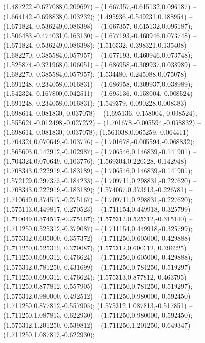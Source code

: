  (1.487222,-0.627088,0.209697) -- (1.667357,-0.615132,0.096187) -- (1.664142,-0.698838,0.103232);
 (1.495936,-0.549231,0.188954) -- (1.671824,-0.536249,0.086398) -- (1.667357,-0.615132,0.096187);
 (1.506483,-0.474031,0.163130) -- (1.677193,-0.460946,0.073748) -- (1.671824,-0.536249,0.086398);
 (1.516532,-0.398321,0.135408) -- (1.682270,-0.385584,0.057957) -- (1.677193,-0.460946,0.073748);
 (1.525874,-0.321968,0.106051) -- (1.686958,-0.309937,0.038989) -- (1.682270,-0.385584,0.057957);
 (1.534480,-0.245088,0.075078) -- (1.691248,-0.234058,0.016831) -- (1.686958,-0.309937,0.038989);
 (1.542324,-0.167800,0.042511) -- (1.695136,-0.158004,-0.008524) -- (1.691248,-0.234058,0.016831);
 (1.549379,-0.090228,0.008383) -- (1.698614,-0.081830,-0.037078) -- (1.695136,-0.158004,-0.008524);
 (1.555624,-0.012498,-0.027272) -- (1.701678,-0.005594,-0.068832) -- (1.698614,-0.081830,-0.037078);
 (1.561038,0.065259,-0.064411) -- (1.704324,0.070649,-0.103776) -- (1.701678,-0.005594,-0.068832);
 (1.565603,0.142912,-0.102987) -- (1.706546,0.146839,-0.141901) -- (1.704324,0.070649,-0.103776);
 (1.569304,0.220328,-0.142948) -- (1.708343,0.222919,-0.183189) -- (1.706546,0.146839,-0.141901);
 (1.572129,0.297373,-0.184233) -- (1.709711,0.298831,-0.227620) -- (1.708343,0.222919,-0.183189);
 (1.574067,0.373913,-0.226781) -- (1.710649,0.374517,-0.275167) -- (1.709711,0.298831,-0.227620);
 (1.575113,0.449817,-0.270523) -- (1.711154,0.449918,-0.325799) -- (1.710649,0.374517,-0.275167);
 (1.575312,0.525312,-0.315140) -- (1.711250,0.525312,-0.379087) -- (1.711154,0.449918,-0.325799);
 (1.575312,0.605000,-0.357372) -- (1.711250,0.605000,-0.429888) -- (1.711250,0.525312,-0.379087);
 (1.575312,0.690312,-0.396225) -- (1.711250,0.690312,-0.476624) -- (1.711250,0.605000,-0.429888);
 (1.575312,0.781250,-0.431699) -- (1.711250,0.781250,-0.519297) -- (1.711250,0.690312,-0.476624);
 (1.575313,0.877812,-0.463795) -- (1.711250,0.877812,-0.557905) -- (1.711250,0.781250,-0.519297);
 (1.575312,0.980000,-0.492512) -- (1.711250,0.980000,-0.592450) -- (1.711250,0.877812,-0.557905);
 (1.575312,1.087813,-0.517851) -- (1.711250,1.087813,-0.622930) -- (1.711250,0.980000,-0.592450);
 (1.575312,1.201250,-0.539812) -- (1.711250,1.201250,-0.649347) -- (1.711250,1.087813,-0.622930);
